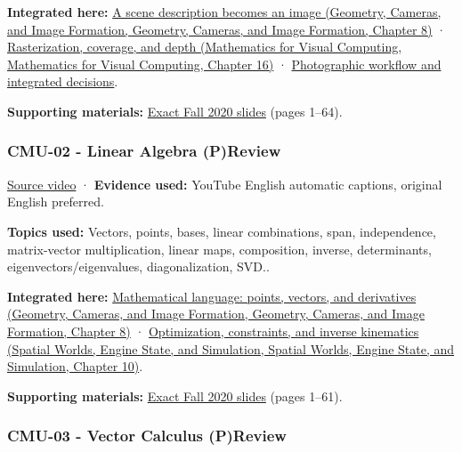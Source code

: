 \textbf{Integrated here:} \href{../03-Geometry-Cameras-and-Image-Formation/main.pdf\#nameddest=03-visual-computing-i-ch001-a-scene-description-becomes-an-image}{A scene description becomes an image (Geometry, Cameras, and Image Formation, Geometry, Cameras, and Image Formation, Chapter 8)} · \href{../02-Mathematics-for-Visual-Computing/main.pdf\#nameddest=03-visual-computing-i-ch012-rasterization-coverage-and-depth}{Rasterization, coverage, and depth (Mathematics for Visual Computing, Mathematics for Visual Computing, Chapter 16)} · \hyperref[04-visual-computing-ii-ch034-photographic-workflow-and-integrated-decisions]{Photographic workflow and integrated decisions}.

\textbf{Supporting materials:} \href{https://15462.courses.cs.cmu.edu/fall2020content/lectures/01_intro/01_intro_slides.pdf}{Exact Fall 2020 slides} (pages 1--64).

\subsubsection{CMU-02 - Linear Algebra (P)Review}\label{04-visual-computing-ii-ch036-cmu-02---linear-algebra-preview}

\href{https://www.youtube.com/watch?v=2c8XQlQApx8}{Source video} · \textbf{Evidence used:} YouTube English automatic captions, original English preferred.

\textbf{Topics used:} Vectors, points, bases, linear combinations, span, independence, matrix-vector multiplication, linear maps, composition, inverse, determinants, eigenvectors/eigenvalues, diagonalization, SVD..

\textbf{Integrated here:} \href{../03-Geometry-Cameras-and-Image-Formation/main.pdf\#nameddest=03-visual-computing-i-ch001-mathematical-language-points-vectors-and-derivatives}{Mathematical language: points, vectors, and derivatives (Geometry, Cameras, and Image Formation, Geometry, Cameras, and Image Formation, Chapter 8)} · \href{../05-Spatial-Worlds-Engine-State-and-Simulation/main.pdf\#nameddest=04-visual-computing-ii-ch029-optimization-constraints-and-inverse-kinematics}{Optimization, constraints, and inverse kinematics (Spatial Worlds, Engine State, and Simulation, Spatial Worlds, Engine State, and Simulation, Chapter 10)}.

\textbf{Supporting materials:} \href{https://15462.courses.cs.cmu.edu/fall2020content/lectures/02_linearalgebra/02_linearalgebra_slides.pdf}{Exact Fall 2020 slides} (pages 1--61).

\subsubsection{CMU-03 - Vector Calculus (P)Review}\label{04-visual-computing-ii-ch036-cmu-03---vector-calculus-preview}

